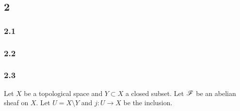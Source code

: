 \documentclass[12pt]{article}
\begin{document}
\subsection{2}

\subsubsection{2.1}

\subsubsection{2.2}

\subsubsection{2.3}

Let $X$ be a topological space and $Y \subset X$ a closed subset. Let $\mathscr{F}$ be an abelian sheaf on $X$. Let $U = X \setminus Y$ and $j : U \to X$ be the inclusion.
\end{document}
